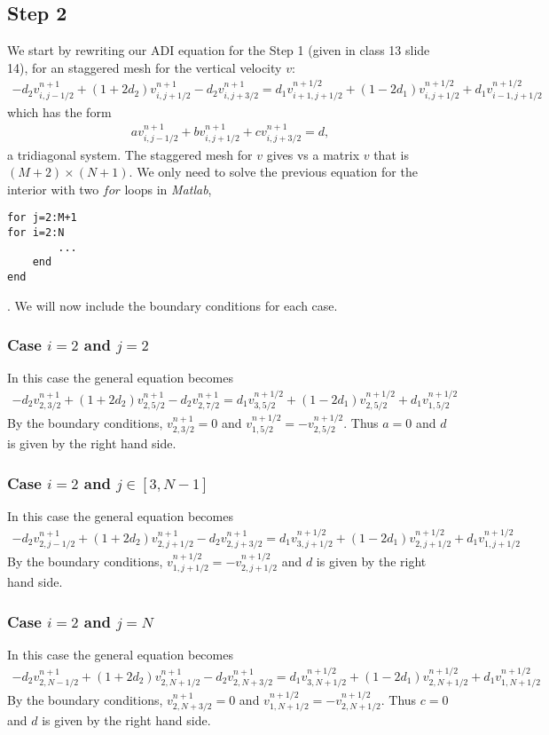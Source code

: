 \subsection{Step 2}
We start by rewriting our ADI equation for the Step 1 (given in class 13 slide 14), for an staggered mesh for the vertical velocity $v$:
\begin{align*}
-d_2v_{i,j-1/2}^{n+1}+(1+2d_2)v_{i,j+1/2}^{n+1}-d_2v_{i,j+3/2}^{n+1}=d_1v_{i+1,j+1/2}^{n+1/2}+(1-2d_1)v_{i,j+1/2}^{n+1/2}+d_1v_{i-1,j+1/2}^{n+1/2}
\end{align*}
which has the form 
\begin{align*}
av_{i,j-1/2}^{n+1}+bv_{i,j+1/2}^{n+1}+cv_{i,j+3/2}^{n+1}=d,
\end{align*}
a tridiagonal system. The staggered mesh for $v$ gives vs a matrix $v$ that is $(M+2)\times(N+1)$. We only need to solve the previous equation for the interior with two $for$ loops in \textsl{Matlab},
\begin{verbatim}
for j=2:M+1
for i=2:N
		...
	end
end
\end{verbatim}.
We will now include the boundary conditions for each case.

\subsubsection*{Case $i=2$ and $j=2$}
In this case the general equation becomes
\begin{align*}
-d_2v_{2,3/2}^{n+1}+(1+2d_2)v_{2,5/2}^{n+1}-d_2v_{2,7/2}^{n+1}=d_1v_{3,5/2}^{n+1/2}+(1-2d_1)v_{2,5/2}^{n+1/2}+d_1v_{1,5/2}^{n+1/2}
\end{align*}
By the boundary conditions, $v_{2,3/2}^{n+1}=0$ and $v_{1,5/2}^{n+1/2}=-v_{2,5/2}^{n+1/2}$. Thus $a=0$ and $d$ is given by the right hand side.

\subsubsection*{Case $i=2$ and $j\in[3,N-1]$}
In this case the general equation becomes
\begin{align*}
-d_2v_{2,j-1/2}^{n+1}+(1+2d_2)v_{2,j+1/2}^{n+1}-d_2v_{2,j+3/2}^{n+1}=d_1v_{3,j+1/2}^{n+1/2}+(1-2d_1)v_{2,j+1/2}^{n+1/2}+d_1v_{1,j+1/2}^{n+1/2}
\end{align*}
By the boundary conditions, $v_{1,j+1/2}^{n+1/2}=-v_{2,j+1/2}^{n+1/2}$ and $d$ is given by the right hand side.

\subsubsection*{Case $i=2$ and $j=N$}
In this case the general equation becomes
\begin{align*}
-d_2v_{2,N-1/2}^{n+1}+(1+2d_2)v_{2,N+1/2}^{n+1}-d_2v_{2,N+3/2}^{n+1}=d_1v_{3,N+1/2}^{n+1/2}+(1-2d_1)v_{2,N+1/2}^{n+1/2}+d_1v_{1,N+1/2}^{n+1/2}
\end{align*}
By the boundary conditions, $v_{2,N+3/2}^{n+1}=0$ and $v_{1,N+1/2}^{n+1/2}=-v_{2,N+1/2}^{n+1/2}$. Thus $c=0$ and $d$ is given by the right hand side.

